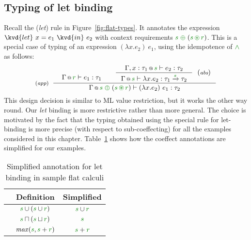 
\subsection{Typing of let binding}

Recall the (\emph{let}) rule in Figure~\ref{fig:flat-types}. It annotates the expression 
$\kvd{let}~x=e_1~\kvd{in}~e_2$ with context requirements $\cclrd{s}\;\cpar\;(\cclrd{s}\,\cseq\,\cclrd{r})$.
This is a special case of typing of an expression $(\lambda x.e_2)~e_1$, using the idempotence
of $\czip$ as follows:
%
\begin{equation*}
\tyrule{app}
  {\begin{array}{l}
   \vspace{-1.5em}
   \coctx{\Gamma}{\cclrd{r}} \vdash e_1 : \tau_1
   \end{array} &
   \tyruler{abs}
       { \coctx{\Gamma, x:\tau_1}{\cclrd{s}} \vdash e_2 : \tau_2 }
       { \coctx{\Gamma}{\cclrd{s}} \vdash \lambda x.e_2 : \tau_1 \xrightarrow{\cclrd{s}} \tau_2 } }
  { \coctx{\Gamma}{\cclrd{s}\;\cpar\;(\cclrd{s}\,\cseq\,\cclrd{r})} \vdash (\lambda x.e_2)~e_1 : \tau_2 }    
\end{equation*}
%
This design decision is similar to ML value restriction, but it works the other way round. Our
\emph{let} binding is more restrictive rather than more general. The choice is motivated by the 
fact that the typing obtained using the special rule for let-binding is more precise (with respect 
to sub-coeffecting) for all the examples considered in this chapter. Table~\ref{tab:flat-simplelet}
shows how the coeffect annotations are simplified for our examples.

\begin{table}[!h]
\begin{center}
\begin{tabular}{ | l | c | c |}
\hline
& \textbf{\footnotesize Definition\hspace{1em}} & \textbf{\footnotesize Simplified\hspace{1em}} \\ \hline
\hspace{-1em}{\footnotesize Implicit parameters} & $\cclrd{s} \cup (\cclrd{s} \cup \cclrd{r})$ & $\cclrd{s} \cup \cclrd{r}$ \\ \hline
\hspace{-1em}{\footnotesize Liveness} & $\cclrd{s} \sqcap (\cclrd{s} \sqcup \cclrd{r})$ & $\cclrd{s}$ \\ \hline
\hspace{-1em}{\footnotesize Data-flow} & $\mathit{max}(\cclrd{s}, \cclrd{s} + \cclrd{r})$ & $\cclrd{s} + \cclrd{r}$ \\ \hline
\end{tabular}
\end{center}

\vspace{-0.5em}
\caption{Simplified annotation for let binding in sample flat calculi}
\label{tab:flat-simplelet}
\end{table}

